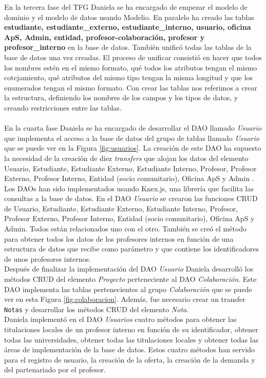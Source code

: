 \documentclass[11pt]{book}
\begin{document}
En la tercera fase del TFG Daniela se ha encargado de empezar el modelo de dominio y el modelo de datos usando Modelio. En paralelo ha creado las tablas \textbf{estudiante, estudiante\_externo, estudiante\_interno, usuario, oficina ApS, Admin, entidad, profesor-colaboración, profesor y profesor\_interno} en la base de datos. También unificó todas las tablas de la base de datos una vez creadas. El proceso de unificar consistió en hacer que todos los nombres estén en el mismo formato, qué todos los atributos tengan el mismo cotejamiento, qué atributos del mismo tipo tengan la misma longitud y que los enumerados tengan el mismo formato. Con crear las tablas nos referimos a crear la estructura, definiendo los nombres de los campos y los tipos de datos, y creando restricciones entre las tablas.\\\\
En la cuarta fase Daniela se ha encargado de desarrollar el DAO llamado \textit{Usuario} que implementa el acceso a la base de datos del grupo de tablas llamado \textit{Usuario} que se puede ver en la Figura \ref{fig:usuarios}. La creación de este DAO ha supuesto la necesidad de la creación de diez \textit{transfers} que alojan los datos del elemento Usuario, Estudiante, Estudiante Externo, Estudiante Interno, Profesor, Profesor Externo, Profesor Interno, Entidad (socio comunitario), Oficina ApS y Admin . Los DAOs han sido implementados usando Knex.js, una librería que facilita las consultas a la base de datos. En el DAO \textit{Usuario} se crearon las funciones CRUD de Usuario, Estudiante, Estudiante Externo, Estudiante Interno, Profesor, Profesor Externo, Profesor Interno, Entidad (socio comunitario), Oficina ApS y Admin. Todos están relacionados uno con el otro. También se creó el método para obtener todos los datos de los profesores internos en función de una estructura de datos que recibe como parámetro y que contiene los identificadores de unos profesores internos.\\
Después de finalizar la implementación del DAO \textit{Usuario} Daniela desarrolló los métodos CRUD del elemento \textit{Proyecto} perteneciente al DAO \textit{Colaboración}. Este DAO implementa las tablas pertenecientes al grupo \textit{Colaboración} que se puede ver en esta Figura \ref{fig:colaboracion}. Además, fue necesario crear un transfer \texttt{Notas} y desarrollar los métodos CRUD del elemento \textit{Nota}.\\
 Daniela implementó en el DAO \textit{Usuarios} cuatro métodos para obtener las titulaciones locales de un profesor interno en función de su identificador, obtener todas las universidades, obtener todas las titulaciones locales y obtener todas las áreas de implementación de la base de datos. Estos cuatro métodos han servido para el registro de usuario, la creación de la oferta, la creación de la demanda y del partenariado por el profesor.\\
\end{document}
